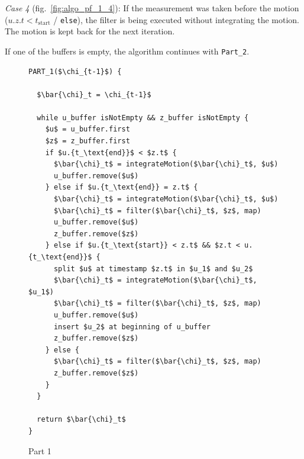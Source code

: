 \emph{Case 4} (fig.\ \ref{fig:algo_pf_1_4}): If the measurement was taken before the motion ($u.{z.t < t_\text{start}}$ / \texttt{else}), the filter is being executed without integrating the motion. The motion is kept back for the next iteration.

If one of the buffers is empty, the algorithm continues with \texttt{Part\_2}.

\begin{figure}
\begin{lstlisting}[mathescape]
PART_1($\chi_{t-1}$) {

  $\bar{\chi}_t = \chi_{t-1}$

  while u_buffer isNotEmpty && z_buffer isNotEmpty {
    $u$ = u_buffer.first
    $z$ = z_buffer.first
    if $u.{t_\text{end}}$ < $z.t$ {
      $\bar{\chi}_t$ = integrateMotion($\bar{\chi}_t$, $u$)
      u_buffer.remove($u$)
    } else if $u.{t_\text{end}} = z.t$ {
      $\bar{\chi}_t$ = integrateMotion($\bar{\chi}_t$, $u$)
      $\bar{\chi}_t$ = filter($\bar{\chi}_t$, $z$, map)
      u_buffer.remove($u$)
      z_buffer.remove($z$)
    } else if $u.{t_\text{start}} < z.t$ && $z.t < u.{t_\text{end}}$ {
      split $u$ at timestamp $z.t$ in $u_1$ and $u_2$
      $\bar{\chi}_t$ = integrateMotion($\bar{\chi}_t$, $u_1$)
      $\bar{\chi}_t$ = filter($\bar{\chi}_t$, $z$, map)
      u_buffer.remove($u$)
      insert $u_2$ at beginning of u_buffer
      z_buffer.remove($z$)
    } else {
      $\bar{\chi}_t$ = filter($\bar{\chi}_t$, $z$, map)
      z_buffer.remove($z$)
    }
  }
  
  return $\bar{\chi}_t$
}
\end{lstlisting}
\caption{Part 1}
\label{lst:algo_pf_1}
\end{figure}


